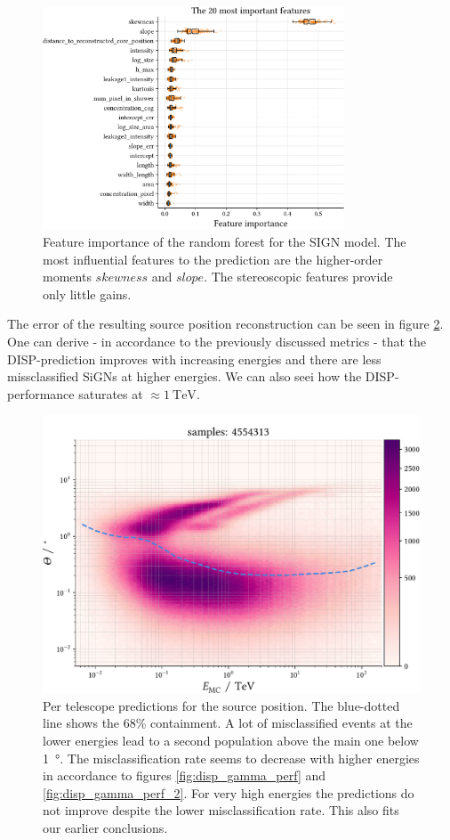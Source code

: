 \begin{figure}
	\centering
	\includegraphics[width=0.8\textwidth]{../analysis/plots/sign_features.pdf}
	\caption{Feature importance of the random forest for the SIGN model.
	        The most influential features to the prediction are the higher-order moments $skewness$
            and $slope$. The stereoscopic features provide only little gains.}
	\label{fig:sign_features}
\end{figure}


The error of the resulting source position reconstruction 
can be seen in figure \ref{fig:sens_telescope}.
One can derive - in accordance to the previously discussed metrics - 
that the DISP-prediction improves with increasing energies and there are less
missclassified SiGNs at higher energies.
We can also seei how the DISP-performance saturates at $\approx \SI{1}{\tera\electronvolt}$.

\begin{figure}
    \centering
    \includegraphics[width=.8\textwidth]{../analysis/plots/gamma/tel_vs_energy.pdf}
    \caption{Per telescope predictions for the source position. The blue-dotted line 
    shows the 68\% containment. A lot of misclassified events at the lower energies
    lead to a second population above the main one below \SI{1}{\degree}.
    The misclassification rate seems to decrease with higher energies 
    in accordance to figures \ref{fig:disp_gamma_perf} and \ref{fig:disp_gamma_perf_2}.
    For very high energies the predictions do not improve despite the lower 
    misclassification rate. This also fits our earlier conclusions.}
    \label{fig:sens_telescope}
\end{figure}


